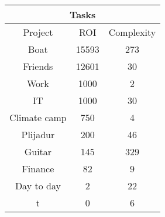 \begin{longtable}{|c|c|c|}
\hline
\multicolumn{3}{|c|}{Tasks} \\
\hline
Project & ROI & Complexity \\
\hline
Boat & 15593 & 273\\
\hline
Friends & 12601 & 30\\
\hline
Work & 1000 & 2\\
\hline
IT & 1000 & 30\\
\hline
Climate camp & 750 & 4\\
\hline
Plijadur & 200 & 46\\
\hline
Guitar & 145 & 329\\
\hline
Finance & 82 & 9\\
\hline
Day to day & 2 & 22\\
\hline
t & 0 & 6\\
\hline
\end{longtable}
